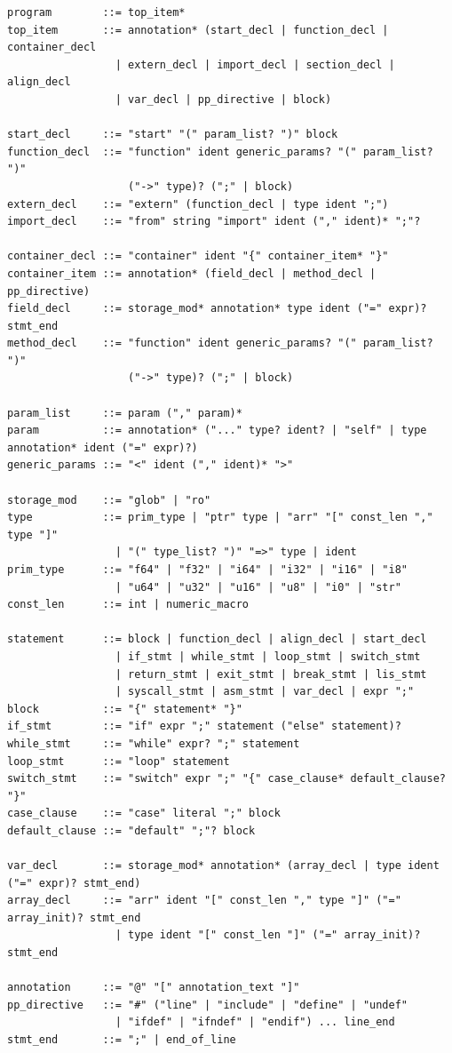 \documentclass[10pt,twocolumn]{article}
\begin{document}
\begin{lstlisting}[caption={Abridged APL grammar.}]
program        ::= top_item*
top_item       ::= annotation* (start_decl | function_decl | container_decl
                 | extern_decl | import_decl | section_decl | align_decl
                 | var_decl | pp_directive | block)

start_decl     ::= "start" "(" param_list? ")" block
function_decl  ::= "function" ident generic_params? "(" param_list? ")"
                   ("->" type)? (";" | block)
extern_decl    ::= "extern" (function_decl | type ident ";")
import_decl    ::= "from" string "import" ident ("," ident)* ";"?

container_decl ::= "container" ident "{" container_item* "}"
container_item ::= annotation* (field_decl | method_decl | pp_directive)
field_decl     ::= storage_mod* annotation* type ident ("=" expr)? stmt_end
method_decl    ::= "function" ident generic_params? "(" param_list? ")"
                   ("->" type)? (";" | block)

param_list     ::= param ("," param)*
param          ::= annotation* ("..." type? ident? | "self" | type annotation* ident ("=" expr)?)
generic_params ::= "<" ident ("," ident)* ">"

storage_mod    ::= "glob" | "ro"
type           ::= prim_type | "ptr" type | "arr" "[" const_len "," type "]"
                 | "(" type_list? ")" "=>" type | ident
prim_type      ::= "f64" | "f32" | "i64" | "i32" | "i16" | "i8"
                 | "u64" | "u32" | "u16" | "u8" | "i0" | "str"
const_len      ::= int | numeric_macro

statement      ::= block | function_decl | align_decl | start_decl
                 | if_stmt | while_stmt | loop_stmt | switch_stmt
                 | return_stmt | exit_stmt | break_stmt | lis_stmt
                 | syscall_stmt | asm_stmt | var_decl | expr ";"
block          ::= "{" statement* "}"
if_stmt        ::= "if" expr ";" statement ("else" statement)?
while_stmt     ::= "while" expr? ";" statement
loop_stmt      ::= "loop" statement
switch_stmt    ::= "switch" expr ";" "{" case_clause* default_clause? "}"
case_clause    ::= "case" literal ";" block
default_clause ::= "default" ";"? block

var_decl       ::= storage_mod* annotation* (array_decl | type ident ("=" expr)? stmt_end)
array_decl     ::= "arr" ident "[" const_len "," type "]" ("=" array_init)? stmt_end
                 | type ident "[" const_len "]" ("=" array_init)? stmt_end

annotation     ::= "@" "[" annotation_text "]"
pp_directive   ::= "#" ("line" | "include" | "define" | "undef"
                 | "ifdef" | "ifndef" | "endif") ... line_end
stmt_end       ::= ";" | end_of_line
\end{lstlisting}
\end{document}
